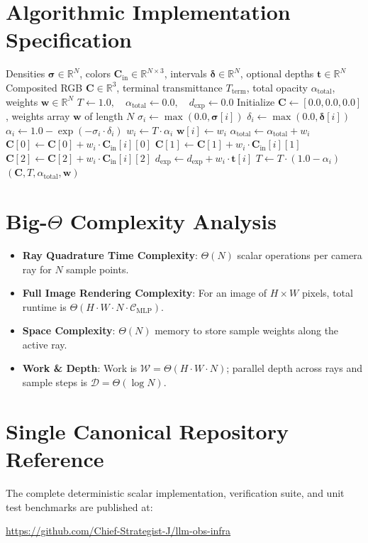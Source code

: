 \documentclass[11pt,a4paper]{article}
\theoremstyle{definition}
\begin{document}
\section{Algorithmic Implementation Specification}

\begin{algorithm}[H]
\caption{Discrete Volume Rendering Quadrature Ray-Marcher}
\begin{algorithmic}[1]
\Require Densities $\boldsymbol{\sigma} \in \mathbb{R}^N$, colors $\mathbf{C}_{\text{in}} \in \mathbb{R}^{N \times 3}$, intervals $\boldsymbol{\delta} \in \mathbb{R}^N$, optional depths $\mathbf{t} \in \mathbb{R}^N$
\Ensure Composited RGB $\mathbf{C} \in \mathbb{R}^3$, terminal transmittance $T_{\text{term}}$, total opacity $\alpha_{\text{total}}$, weights $\mathbf{w} \in \mathbb{R}^N$
\State $T \gets 1.0, \quad \alpha_{\text{total}} \gets 0.0, \quad d_{\text{exp}} \gets 0.0$
\State Initialize $\mathbf{C} \gets [0.0, 0.0, 0.0]$, weights array $\mathbf{w}$ of length $N$
    \State $\sigma_i \gets \max(0.0, \boldsymbol{\sigma}[i])$
    \State $\delta_i \gets \max(0.0, \boldsymbol{\delta}[i])$
    \State $\alpha_i \gets 1.0 - \exp(-\sigma_i \cdot \delta_i)$
    \State $w_i \gets T \cdot \alpha_i$
    \State $\mathbf{w}[i] \gets w_i$
    \State $\alpha_{\text{total}} \gets \alpha_{\text{total}} + w_i$
    \State $\mathbf{C}[0] \gets \mathbf{C}[0] + w_i \cdot \mathbf{C}_{\text{in}}[i][0]$
    \State $\mathbf{C}[1] \gets \mathbf{C}[1] + w_i \cdot \mathbf{C}_{\text{in}}[i][1]$
    \State $\mathbf{C}[2] \gets \mathbf{C}[2] + w_i \cdot \mathbf{C}_{\text{in}}[i][2]$
     \State $d_{\text{exp}} \gets d_{\text{exp}} + w_i \cdot \mathbf{t}[i]$ \EndIf
    \State $T \gets T \cdot (1.0 - \alpha_i)$
\EndFor
\State \Return $(\mathbf{C}, T, \alpha_{\text{total}}, \mathbf{w})$
\end{algorithmic}
\end{algorithm}

\section{Big-$\Theta$ Complexity Analysis}

\begin{itemize}
    \item \textbf{Ray Quadrature Time Complexity}: $\Theta(N)$ scalar operations per camera ray for $N$ sample points.
    \item \textbf{Full Image Rendering Complexity}: For an image of $H \times W$ pixels, total runtime is $\Theta(H \cdot W \cdot N \cdot \mathcal{C}_{\text{MLP}})$.
    \item \textbf{Space Complexity}: $\Theta(N)$ memory to store sample weights along the active ray.
    \item \textbf{Work \& Depth}: Work is $\mathcal{W} = \Theta(H \cdot W \cdot N)$; parallel depth across rays and sample steps is $\mathcal{D} = \Theta(\log N)$.
\end{itemize}

\section{Single Canonical Repository Reference}

The complete deterministic scalar implementation, verification suite, and unit test benchmarks are published at:
\begin{center}
\url{https://github.com/Chief-Strategist-J/llm-obs-infra}
\end{center}
\end{document}
